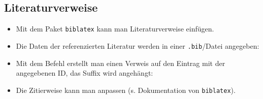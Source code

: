 \subsection{Literaturverweise}

\begin{frame}{\subsecname}
    \begin{itemize}
        \item Mit dem Paket \texttt{biblatex} kann man Literaturverweise einfügen.
        \item Die Daten der referenzierten \alert{Literatur} werden in einer \texttt{.bib}\-/Datei
            angegeben:
        \item Mit dem Befehl  erstellt man einen \alert{Verweis} auf
            den Eintrag mit der angegebenen ID, das Suffix wird angehängt:
        \item Die Zitierweise kann man anpassen (s. Dokumentation von \texttt{biblatex}).
    \end{itemize}
\end{frame}
